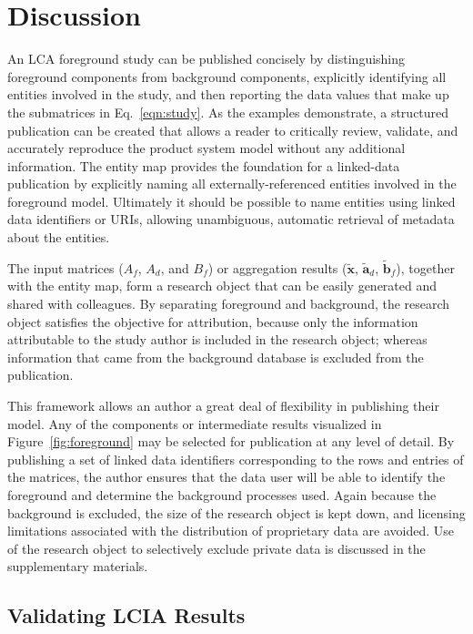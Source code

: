 \section{Discussion}

An LCA foreground study can be published concisely by distinguishing foreground components from background components, explicitly identifying all entities involved in the study, and then reporting the data values that make up the submatrices in Eq.~\ref{eqn:study}.  As the examples demonstrate, a structured publication can be created that allows a reader to critically review, validate, and accurately reproduce the product system model without any additional information.  The entity map provides the foundation for a linked-data publication by explicitly naming all externally-referenced entities involved in the foreground model.  Ultimately it should be possible to name entities using linked data identifiers or URIs, allowing unambiguous, automatic retrieval of metadata about the entities.

The input matrices ($A_f$, $A_d$, and $B_f$) or aggregation results ($\tilde{\mathbf{x}}$, $\tilde{\mathbf{a}}_d$, $\tilde{\mathbf{b}}_f$), together with the entity map, form a research object that can be easily generated and shared with colleagues.  By separating foreground and background, the research object satisfies the objective for attribution, because only the information attributable to the study author is included in the research object; whereas information that came from the background database is excluded from the publication.

This framework allows an author a great deal of flexibility in publishing their model.  Any of the components or intermediate results visualized in Figure~\ref{fig:foreground} may be selected for publication at any level of detail.  By publishing a set of linked data identifiers corresponding to the rows and entries of the matrices, the author ensures that the data user will be able to identify the foreground and determine the background processes used. Again because the background is excluded, the size of the research object is kept down, and licensing limitations associated with the distribution of proprietary data are avoided. Use of the research object to selectively exclude private data is discussed in the supplementary materials.

\subsection{Validating LCIA Results}

